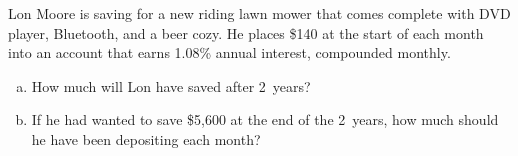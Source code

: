 \documentclass[11pt,letterpaper]{article}
\begin{document}
\newpage



 Lon Moore is saving for a new riding lawn mower that comes complete with DVD player, Bluetooth, and a beer cozy. He places \$140 at the start of each month into an account that earns 1.08\% annual interest, compounded monthly. 
	\begin{enumerate}[(a)]
	\item How much will Lon have saved after 2~years?
	\item If he had wanted to save \$5,600 at the end of the 2~years, how much should he have been depositing each month?	
	\end{enumerate}
\end{document}
